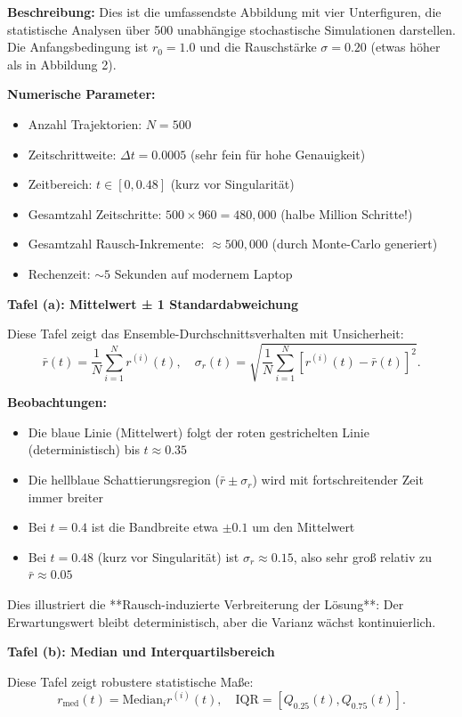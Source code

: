 \documentclass[a4paper,12pt]{article}
\theoremstyle{definition}
\begin{document}
\textbf{Beschreibung:} Dies ist die umfassendste Abbildung mit vier Unterfiguren, die statistische Analysen über 500 unabhängige stochastische Simulationen darstellen. Die Anfangsbedingung ist $r_0 = 1.0$ und die Rauschstärke $\sigma = 0.20$ (etwas höher als in Abbildung 2).

\textbf{Numerische Parameter:}
\begin{itemize}
	\item Anzahl Trajektorien: $N = 500$
	\item Zeitschrittweite: $\Delta t = 0.0005$ (sehr fein für hohe Genauigkeit)
	\item Zeitbereich: $t \in [0, 0.48]$ (kurz vor Singularität)
	\item Gesamtzahl Zeitschritte: $500 \times 960 = 480,000$ (halbe Million Schritte!)
	\item Gesamtzahl Rausch-Inkremente: $\approx 500,000$ (durch Monte-Carlo generiert)
	\item Rechenzeit: $\sim 5$ Sekunden auf modernem Laptop
\end{itemize}

\textbf{Tafel (a): Mittelwert ± 1 Standardabweichung}

Diese Tafel zeigt das Ensemble-Durchschnittsverhalten mit Unsicherheit:
\[
\bar{r}(t) = \frac{1}{N} \sum_{i=1}^N r^{(i)}(t), \quad \sigma_r(t) = \sqrt{\frac{1}{N} \sum_{i=1}^N [r^{(i)}(t) - \bar{r}(t)]^2}.
\]

\textbf{Beobachtungen:}
\begin{itemize}
	\item Die blaue Linie (Mittelwert) folgt der roten gestrichelten Linie (deterministisch) bis $t \approx 0.35$
	\item Die hellblaue Schattierungsregion ($\bar{r} \pm \sigma_r$) wird mit fortschreitender Zeit immer breiter
	\item Bei $t = 0.4$ ist die Bandbreite etwa $\pm 0.1$ um den Mittelwert
	\item Bei $t = 0.48$ (kurz vor Singularität) ist $\sigma_r \approx 0.15$, also sehr groß relativ zu $\bar{r} \approx 0.05$
\end{itemize}

Dies illustriert die **Rausch-induzierte Verbreiterung der Lösung**: Der Erwartungswert bleibt deterministisch, aber die Varianz wächst kontinuierlich.

\textbf{Tafel (b): Median und Interquartilsbereich}

Diese Tafel zeigt robustere statistische Maße:
\[
r_{\text{med}}(t) = \text{Median}_{i} r^{(i)}(t), \quad \text{IQR} = [Q_{0.25}(t), Q_{0.75}(t)].
\]
\end{document}

